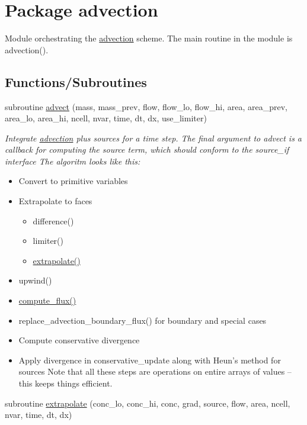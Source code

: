\hypertarget{a00052}{
\section{Package advection}
\label{a00052}
}
Module orchestrating the \hyperlink{a00052}{advection} scheme. The main routine in the module is advection().  


\subsection*{Functions/Subroutines}
\begin{CompactItemize}
\item 
subroutine \hyperlink{a00052_9ec45d9c2fabe0abb0a60795bc228f59}{advect} (mass, mass\_\-prev, flow, flow\_\-lo, flow\_\-hi, area, area\_\-prev, area\_\-lo, area\_\-hi, ncell, nvar, time, dt, dx, use\_\-limiter)
\begin{CompactList}\small\item\em Integrate \hyperlink{a00052}{advection} plus sources for a time step. The final argument to advect is a callback for computing the source term, which should conform to the source\_\-if interface The algoritm looks like this:\begin{itemize}
\item Convert to primitive variables\item Extrapolate to faces\begin{itemize}
\item difference()\item limiter()\item \hyperlink{a00052_36ba824cb5dc6ca6127866376d2e79ec}{extrapolate()}\end{itemize}
\item upwind()\item \hyperlink{a00052_3947a8a29b1c666b2d1b7223215e9873}{compute\_\-flux()}\item replace\_\-advection\_\-boundary\_\-flux() for boundary and special cases\item Compute conservative divergence\item Apply divergence in conservative\_\-update along with Heun's method for sources Note that all these steps are operations on entire arrays of values -- this keeps things efficient. \end{itemize}
\item\end{CompactList}\item 
subroutine \hyperlink{a00052_36ba824cb5dc6ca6127866376d2e79ec}{extrapolate} (conc\_\-lo, conc\_\-hi, conc, grad, source, flow, area, ncell, nvar, time, dt, dx)

\end{CompactItemize}
